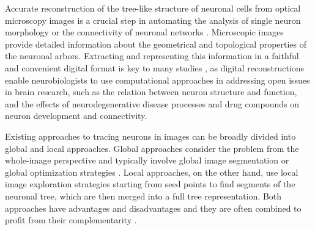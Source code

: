 \documentclass[noinfo,nocrop,final]{bioinfo}
\begin{document}
Accurate reconstruction of the tree-like structure of neuronal cells from optical microscopy images is a crucial step in automating the analysis of single neuron morphology or the connectivity of neuronal networks \citep{meijering2010neuron, donohue2011automated, Peng-2015}. Microscopic images provide detailed information about the geometrical and topological properties of the neuronal arbors. Extracting and representing this information in a faithful and convenient digital format is key to many studies \citep{ascoli2002computational, ascoli2007neuromorpho, svoboda2011past, senft2011brief,halavi2012digital, Lu-2015}, as digital reconstructions enable neurobiologists to use computational approaches in addressing open issues in brain research, such as the relation between neuron structure and function, and the effects of neurodegenerative disease processes and drug compounds on neuron development and connectivity.

Existing approaches to tracing neurons in images can be broadly divided into global and local approaches. Global approaches consider the problem from the whole-image perspective and typically involve global image segmentation \citep{Wearne-2005, Basu-2013, De-2016} or global optimization strategies \citep{turetken2011automated, xiao2013app2}. Local approaches, on the other hand, use local image exploration strategies starting from seed points \citep{peng2011automatic, Choromanska-2012, yang2013distance} to find segments of the neuronal tree, which are then merged into a full tree representation. Both approaches have advantages and disadvantages and they are often combined to profit from their complementarity \citep{zhao2011automated, Jimenez-2015}.
\end{document}
